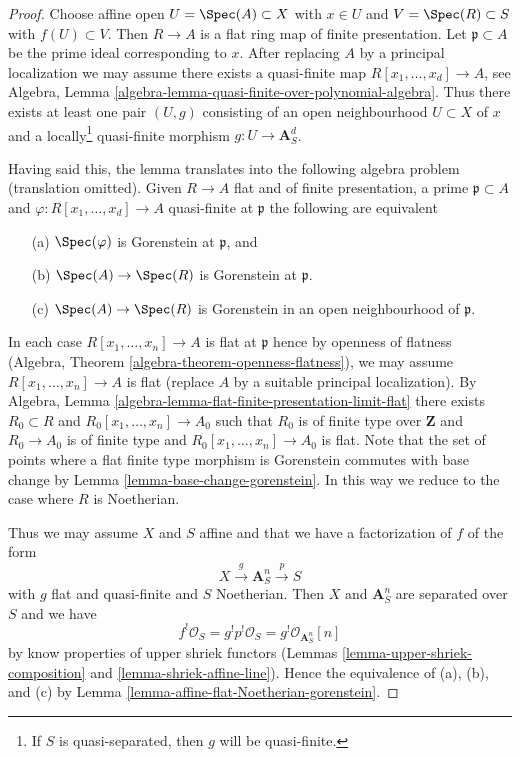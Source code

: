 \begin{proof}
Choose affine open $U = \Spec(A) \subset X$ with $x \in U$ and
$V = \Spec(R) \subset S$ with $f(U) \subset V$. Then $R \to A$
is a flat ring map of finite presentation. Let $\mathfrak p \subset A$
be the prime ideal corresponding to $x$. After replacing $A$ by a
principal localization we may assume there exists a quasi-finite map
$R[x_1, \ldots, x_d]  \to A$, see
Algebra, Lemma \ref{algebra-lemma-quasi-finite-over-polynomial-algebra}.
Thus there exists at least one pair $(U, g)$ consisting of an
open neighbourhood $U \subset X$ of $x$ and a locally\footnote{If $S$
is quasi-separated, then $g$ will be quasi-finite.} quasi-finite morphism
$g : U \to \mathbf{A}^d_S$.

\medskip\noindent
Having said this, the lemma translates into the following algebra
problem (translation omitted). Given $R \to A$ flat and of finite
presentation, a prime $\mathfrak p \subset A$ and
$\varphi : R[x_1, \ldots, x_d] \to A$ quasi-finite at $\mathfrak p$
the following are equivalent
\begin{enumerate}
\item[(a)] $\Spec(\varphi)$ is Gorenstein at $\mathfrak p$, and
\item[(b)] $\Spec(A) \to \Spec(R)$ is Gorenstein at $\mathfrak p$.
\item[(c)] $\Spec(A) \to \Spec(R)$ is Gorenstein in an open neighbourhood
of $\mathfrak p$.
\end{enumerate}
In each case $R[x_1, \ldots, x_n] \to A$ is flat at $\mathfrak p$
hence by openness of flatness
(Algebra, Theorem \ref{algebra-theorem-openness-flatness}),
we may assume $R[x_1, \ldots, x_n] \to A$
is flat (replace $A$ by a suitable principal localization).
By Algebra, Lemma \ref{algebra-lemma-flat-finite-presentation-limit-flat}
there exists $R_0 \subset R$ and $R_0[x_1, \ldots, x_n] \to A_0$
such that $R_0$ is of finite type over $\mathbf{Z}$ and
$R_0 \to A_0$ is of finite type and $R_0[x_1, \ldots, x_n] \to A_0$ is flat.
Note that the set of points where a flat finite type morphism
is Gorenstein commutes with base change by
Lemma \ref{lemma-base-change-gorenstein}.
In this way we reduce to the case where $R$ is Noetherian.

\medskip\noindent
Thus we may assume $X$ and $S$ affine and that
we have a factorization of $f$ of the form
$$
X \xrightarrow{g} \mathbf{A}^n_S \xrightarrow{p} S
$$
with $g$ flat and quasi-finite and $S$ Noetherian. Then $X$ and
$\mathbf{A}^n_S$ are separated over $S$ and we have
$$
f^!\mathcal{O}_S = g^!p^!\mathcal{O}_S = g^!\mathcal{O}_{\mathbf{A}^n_S}[n]
$$
by know properties of upper shriek functors
(Lemmas \ref{lemma-upper-shriek-composition} and
\ref{lemma-shriek-affine-line}).
Hence the equivalence of (a), (b), and (c) by
Lemma \ref{lemma-affine-flat-Noetherian-gorenstein}.
\end{proof}

